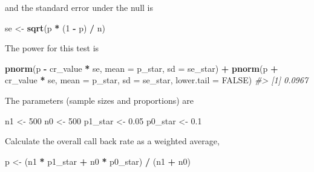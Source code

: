\documentclass[]{book}
\newenvironment{Shaded}{\begin{snugshade}}{\end{snugshade}}
\newcommand{\KeywordTok}[1]{\textcolor[rgb]{0.13,0.29,0.53}{\textbf{#1}}}
\newcommand{\DataTypeTok}[1]{\textcolor[rgb]{0.13,0.29,0.53}{#1}}
\newcommand{\DecValTok}[1]{\textcolor[rgb]{0.00,0.00,0.81}{#1}}
\newcommand{\FloatTok}[1]{\textcolor[rgb]{0.00,0.00,0.81}{#1}}
\newcommand{\StringTok}[1]{\textcolor[rgb]{0.31,0.60,0.02}{#1}}
\newcommand{\CommentTok}[1]{\textcolor[rgb]{0.56,0.35,0.01}{\textit{#1}}}
\newcommand{\OtherTok}[1]{\textcolor[rgb]{0.56,0.35,0.01}{#1}}
\newcommand{\OperatorTok}[1]{\textcolor[rgb]{0.81,0.36,0.00}{\textbf{#1}}}
\newcommand{\NormalTok}[1]{#1}
\theoremstyle{definition}
\theoremstyle{definition}
\theoremstyle{definition}
\theoremstyle{remark}
\begin{document}
and the standard error under the null is

\begin{Shaded}
\begin{Highlighting}[]
\NormalTok{se <-}\StringTok{ }\KeywordTok{sqrt}\NormalTok{(p }\OperatorTok{*}\StringTok{ }\NormalTok{(}\DecValTok{1} \OperatorTok{-}\StringTok{ }\NormalTok{p) }\OperatorTok{/}\StringTok{ }\NormalTok{n)}
\end{Highlighting}
\end{Shaded}

The power for this test is

\begin{Shaded}
\begin{Highlighting}[]
\KeywordTok{pnorm}\NormalTok{(p }\OperatorTok{-}\StringTok{ }\NormalTok{cr_value }\OperatorTok{*}\StringTok{ }\NormalTok{se, }\DataTypeTok{mean =}\NormalTok{ p_star, }\DataTypeTok{sd =}\NormalTok{ se_star) }\OperatorTok{+}
\StringTok{    }\KeywordTok{pnorm}\NormalTok{(p }\OperatorTok{+}\StringTok{ }\NormalTok{cr_value }\OperatorTok{*}\StringTok{ }\NormalTok{se, }\DataTypeTok{mean =}\NormalTok{ p_star, }\DataTypeTok{sd =}\NormalTok{ se_star,}
          \DataTypeTok{lower.tail =} \OtherTok{FALSE}\NormalTok{)}
\CommentTok{#> [1] 0.0967}
\end{Highlighting}
\end{Shaded}

The parameters (sample sizes and proportions) are

\begin{Shaded}
\begin{Highlighting}[]
\NormalTok{n1 <-}\StringTok{ }\DecValTok{500}
\NormalTok{n0 <-}\StringTok{ }\DecValTok{500}
\NormalTok{p1_star <-}\StringTok{ }\FloatTok{0.05}
\NormalTok{p0_star <-}\StringTok{ }\FloatTok{0.1}
\end{Highlighting}
\end{Shaded}

Calculate the overall call back rate as a weighted average,

\begin{Shaded}
\begin{Highlighting}[]
\NormalTok{p <-}\StringTok{ }\NormalTok{(n1 }\OperatorTok{*}\StringTok{ }\NormalTok{p1_star }\OperatorTok{+}\StringTok{ }\NormalTok{n0 }\OperatorTok{*}\StringTok{ }\NormalTok{p0_star) }\OperatorTok{/}\StringTok{ }\NormalTok{(n1 }\OperatorTok{+}\StringTok{ }\NormalTok{n0)}
\end{Highlighting}
\end{Shaded}
\end{document}
